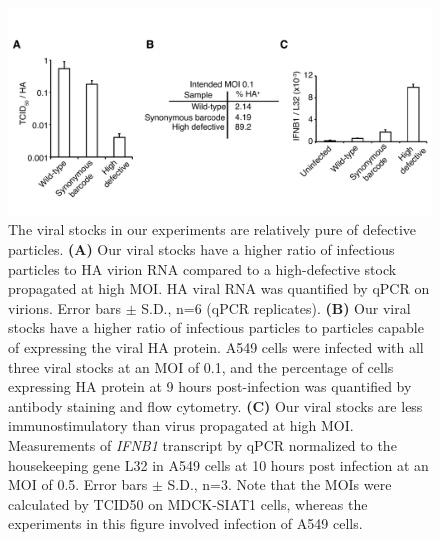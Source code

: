 \documentclass[9pt,lineno]{elife}
\begin{document}
\begin{figure}
\centerline{\includegraphics[width=0.7\linewidth]{figures/Validating_barcode_virus/validating_populations_D02.pdf}}
\caption{\label{fig:viruspopulations} The viral stocks in our experiments are relatively pure of defective particles. 
{\bf (A)}
Our viral stocks have a higher ratio of infectious particles to HA virion RNA compared to a high-defective stock propagated at high MOI.
HA viral RNA was quantified by qPCR on virions. 
Error bars $\pm$ S.D., n=6 (qPCR replicates). 
{\bf (B)} 
Our viral stocks have a higher ratio of infectious particles to particles capable of expressing the viral HA protein.
A549 cells were infected with all three viral stocks at an MOI of 0.1, and the percentage of cells expressing HA protein at 9 hours post-infection was quantified by antibody staining and flow cytometry.
{\bf (C)} 
Our viral stocks are less immunostimulatory than virus propagated at high MOI. 
Measurements of \textit{IFNB1} transcript by qPCR normalized to the housekeeping gene L32 in A549 cells at 10 hours post infection at an MOI of 0.5.
Error bars $\pm$ S.D., n=3.
Note that the MOIs were calculated by TCID50 on MDCK-SIAT1 cells, whereas the experiments in this figure involved infection of A549 cells.
}
\end{figure}
\end{document}
